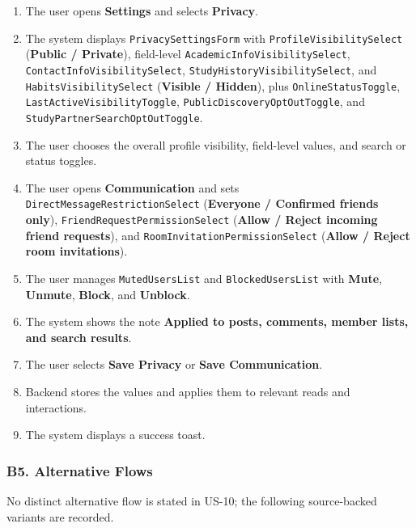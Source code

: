 \documentclass[12pt]{article}
\begin{document}
\begin{enumerate}
\item The user opens \textbf{Settings} and selects \textbf{Privacy}.
\item The system displays \texttt{PrivacySettingsForm} with \texttt{ProfileVisibilitySelect} (\textbf{Public / Private}), field-level \texttt{AcademicInfoVisibilitySelect}, \texttt{ContactInfoVisibilitySelect}, \texttt{StudyHistoryVisibilitySelect}, and \texttt{HabitsVisibilitySelect} (\textbf{Visible / Hidden}), plus \texttt{OnlineStatusToggle}, \texttt{LastActiveVisibilityToggle}, \texttt{PublicDiscoveryOptOutToggle}, and \texttt{StudyPartnerSearchOptOutToggle}.
\item The user chooses the overall profile visibility, field-level values, and search or status toggles.
\item The user opens \textbf{Communication} and sets \texttt{DirectMessageRestrictionSelect} (\textbf{Everyone / Confirmed friends only}), \texttt{FriendRequestPermissionSelect} (\textbf{Allow / Reject incoming friend requests}), and \texttt{RoomInvitationPermissionSelect} (\textbf{Allow / Reject room invitations}).
\item The user manages \texttt{MutedUsersList} and \texttt{BlockedUsersList} with \textbf{Mute}, \textbf{Unmute}, \textbf{Block}, and \textbf{Unblock}.
\item The system shows the note \textbf{Applied to posts, comments, member lists, and search results}.
\item The user selects \textbf{Save Privacy} or \textbf{Save Communication}.
\item Backend stores the values and applies them to relevant reads and interactions.
\item The system displays a success toast.
\end{enumerate}
\par\medskip

\hypertarget{sec:b5-alternative-flows}{}
\subsubsection*{B5. Alternative Flows}
\par\medskip

No distinct alternative flow is stated in US-10; the following source-backed variants are recorded.
\par\medskip

\hypertarget{sec:a1-communication-only-change}{}
\end{document}
